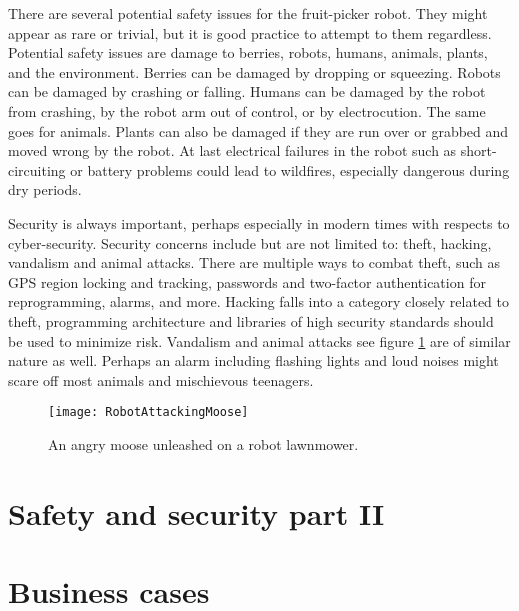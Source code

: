 \documentclass[%
oneside,    %
project,    %
nosummary   %
]{USN-MSc}
\begin{document}
There are several potential safety issues for the fruit-picker robot. They might appear as rare or trivial, but it is good practice to attempt to them regardless.
Potential safety issues are damage to berries, robots, humans, animals, plants, and the environment. Berries can be damaged by dropping or squeezing. Robots can be damaged by crashing or falling. Humans can be damaged by the robot from crashing, by the robot arm out of control, or by electrocution. The same goes for animals. Plants can also be damaged if they are run over or grabbed and moved wrong by the robot. At last electrical failures in the robot such as short-circuiting or battery problems could lead to wildfires, especially dangerous during dry periods.

Security is always important, perhaps especially in modern times with respects to cyber-security. Security concerns include but are not limited to: theft, hacking, vandalism and animal attacks. There are multiple ways to combat theft, such as GPS region locking and tracking, passwords and two-factor authentication for reprogramming, alarms, and more. Hacking falls into a category closely related to theft, programming architecture and libraries of high security standards should be used to minimize risk. Vandalism and animal attacks see figure \ref{fig:anAngryMoose} are of similar nature as well. Perhaps an alarm including flashing lights and loud noises might scare off most animals and mischievous teenagers. 

\begin{figure}[!ht]
  \centering
  \texttt{[image: RobotAttackingMoose]}
  \caption{An angry moose unleashed on a robot lawnmower.}
  \label{fig:anAngryMoose}
\end{figure}

\chapter{Safety and security part II}
\label{ch:safety2}

\chapter{Business cases}
\label{ch:Business}


~\nocite{*}

\cleardoublepage
\end{document}
